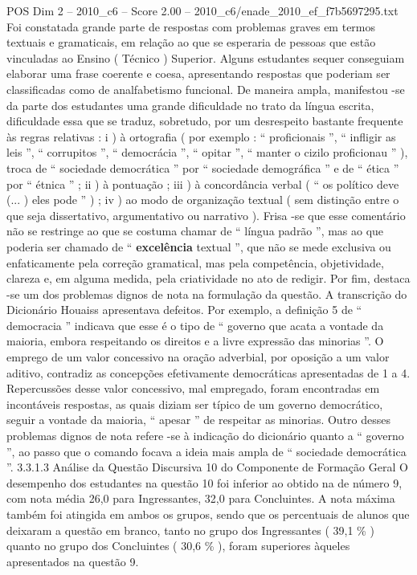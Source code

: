\begin{textsample}{POS Dim 2 – 2010\_c6 – Score 2.00 – 2010\_c6/enade\_2010\_ef\_f7b5697295.txt}
Foi constatada grande parte de respostas com problemas graves em termos textuais e gramaticais, em relação ao que se esperaria de pessoas que estão vinculadas ao Ensino ( Técnico ) Superior.
Alguns estudantes sequer conseguiam elaborar uma frase coerente e coesa, apresentando respostas que poderiam ser classificadas como de analfabetismo funcional.
De maneira ampla, manifestou -se da parte dos estudantes uma grande dificuldade no trato da língua escrita, dificuldade essa que se traduz, sobretudo, por um desrespeito bastante frequente às regras relativas : i ) à ortografia ( por exemplo : “ proficionais ”, “ infligir as leis ”, “ corrupitos ”, “ democrácia ”, “ opitar ”, “ manter o cizilo proficionau ” ), troca de “ sociedade democrática ” por “ sociedade demográfica ” e de “ ética ” por “ étnica ” ; ii ) à pontuação ; iii ) à concordância verbal ( “ os político deve (... ) eles pode ” ) ; iv ) ao modo de organização textual ( sem distinção entre o que seja dissertativo, argumentativo ou narrativo ).
Frisa -se que esse comentário não se restringe ao que se costuma chamar de “ língua padrão ”, mas ao que poderia ser chamado de “ \textbf{excelência} textual ”, que não se mede exclusiva ou enfaticamente pela correção gramatical, mas pela competência, objetividade, clareza e, em alguma medida, pela criatividade no ato de redigir.
Por fim, destaca -se um dos problemas dignos de nota na formulação da questão.
A transcrição do Dicionário Houaiss apresentava defeitos.
Por exemplo, a definição 5 de “ democracia ” indicava que esse é o tipo de “ governo que acata a vontade da maioria, embora respeitando os direitos e a livre expressão das minorias ”.
O emprego de um valor concessivo na oração adverbial, por oposição a um valor aditivo, contradiz as concepções efetivamente democráticas apresentadas de 1 a 4.
Repercussões desse valor concessivo, mal empregado, foram encontradas em incontáveis respostas, as quais diziam ser típico de um governo democrático, seguir a vontade da maioria, “ apesar ” de respeitar as minorias.
Outro desses problemas dignos de nota refere -se à indicação do dicionário quanto a “ governo ”, ao passo que o comando focava a ideia mais ampla de “ sociedade democrática ”. 3.3.1.3 Análise da Questão Discursiva 10 do Componente de Formação Geral O desempenho dos estudantes na questão 10 foi inferior ao obtido na de número 9, com nota média 26,0 para Ingressantes, 32,0 para Concluintes.
A nota máxima também foi atingida em ambos os grupos, sendo que os percentuais de alunos que deixaram a questão em branco, tanto no grupo dos Ingressantes ( 39,1 \% ) quanto no grupo dos Concluintes ( 30,6 \% ), foram superiores àqueles apresentados na questão 9.

\end{textsample}
